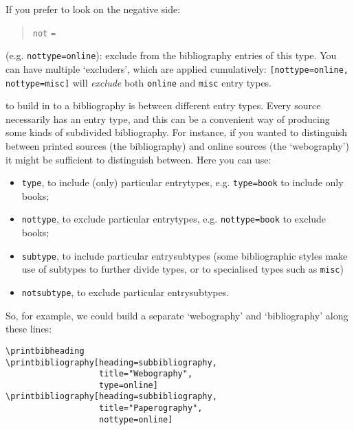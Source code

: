 If you prefer to look on the negative side:
\begin{quote}
\texttt{not} \texttt{=} 
\end{quote}
(e.g. \texttt{nottype=online}): exclude from the bibliography entries of
this type. You can have multiple `excluders', which are applied
cumulatively: \texttt{{[}nottype=online,} \texttt{nottype=misc{]}} will
\emph{exclude} both \texttt{online} and \texttt{misc} entry types.

 to build in to a bibliography
is between different entry types. Every source necessarily has an
entry type, and this can be a convenient way of producing some kinds
of subdivided bibliography. For instance, if you wanted to distinguish
between printed sources (the bibliography) and online sources (the
`webography') it might be sufficient to distinguish between. Here you
can use:
\begin{itemize}
\item \texttt{type}, to include (only) particular entrytypes, e.g.
  \texttt{type=book} to include only books;
\item \texttt{nottype}, to exclude particular entrytypes,
  e.g. \texttt{nottype=book} to exclude books;
\item \texttt{subtype}, to include particular entrysubtypes (some
  bibliographic styles make use of subtypes to further divide types,
  or to specialised types such as \texttt{misc})
\item \texttt{notsubtype}, to exclude particular entrysubtypes.
\end{itemize}

So, for example, we could build a separate `webography' and
`bibliography' along these lines:

\begin{Verbatim}
\printbibheading
\printbibliography[heading=subbibliography,
                   title="Webography",
                   type=online]
\printbibliography[heading=subbibliography,
                   title="Paperography",
                   nottype=online]
\end{Verbatim}

